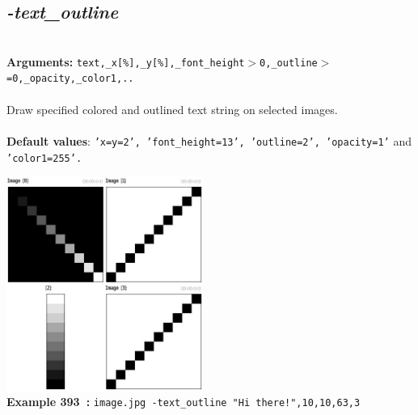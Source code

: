 \documentclass[a4paper,11pt,twoside]{book}
\begin{document}
\subsection{\emph{-text\_outline} }\vspace*{-0.5em}
~\\\textbf{Arguments: } 
{\small \texttt{text,\_x[\%],\_y[\%],\_font\_height$>$0,\_outline$>$=0,\_opacity,\_color1,..}}\\~\\
Draw specified colored and outlined text string on selected images.
~\\~\\\textbf{Default values}: {\small \texttt{'x=y=2', 'font\_height=13', 'outline=2', 'opacity=1'} and \texttt{'color1=255'.}}
\begin{center}\includegraphics[keepaspectratio=true,height=7cm,width=\textwidth]{img/gmic_def393.jpg}\\
{\footnotesize \textbf{Example 393~:} \texttt{image.jpg -text\_outline "Hi there!",10,10,63,3}}
\end{center}
\end{document}
